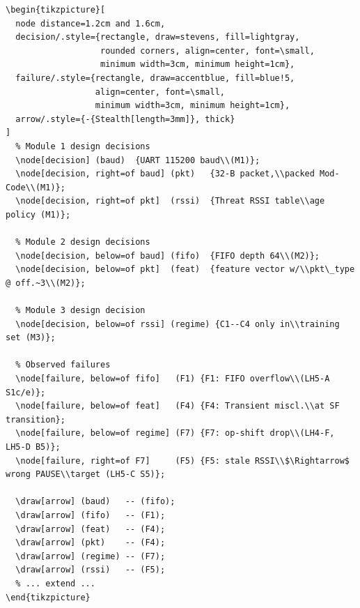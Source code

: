 \documentclass[11pt,letterpaper]{article}
\begin{document}
\begin{lstlisting}[language={[LaTeX]TeX}, caption={Starter TikZ skeleton for \texttt{cross\_domain\_map.tex} --- extend with your own nodes.}]
\begin{tikzpicture}[
  node distance=1.2cm and 1.6cm,
  decision/.style={rectangle, draw=stevens, fill=lightgray,
                   rounded corners, align=center, font=\small,
                   minimum width=3cm, minimum height=1cm},
  failure/.style={rectangle, draw=accentblue, fill=blue!5,
                  align=center, font=\small,
                  minimum width=3cm, minimum height=1cm},
  arrow/.style={-{Stealth[length=3mm]}, thick}
]
  % Module 1 design decisions
  \node[decision] (baud)  {UART 115200 baud\\(M1)};
  \node[decision, right=of baud] (pkt)   {32-B packet,\\packed Mod-Code\\(M1)};
  \node[decision, right=of pkt]  (rssi)  {Threat RSSI table\\age policy (M1)};

  % Module 2 design decisions
  \node[decision, below=of baud] (fifo)  {FIFO depth 64\\(M2)};
  \node[decision, below=of pkt]  (feat)  {feature vector w/\\pkt\_type @ off.~3\\(M2)};

  % Module 3 design decision
  \node[decision, below=of rssi] (regime) {C1--C4 only in\\training set (M3)};

  % Observed failures
  \node[failure, below=of fifo]   (F1) {F1: FIFO overflow\\(LH5-A S1c/e)};
  \node[failure, below=of feat]   (F4) {F4: Transient miscl.\\at SF transition};
  \node[failure, below=of regime] (F7) {F7: op-shift drop\\(LH4-F, LH5-D B5)};
  \node[failure, right=of F7]     (F5) {F5: stale RSSI\\$\Rightarrow$ wrong PAUSE\\target (LH5-C S5)};

  \draw[arrow] (baud)   -- (fifo);
  \draw[arrow] (fifo)   -- (F1);
  \draw[arrow] (feat)   -- (F4);
  \draw[arrow] (pkt)    -- (F4);
  \draw[arrow] (regime) -- (F7);
  \draw[arrow] (rssi)   -- (F5);
  % ... extend ...
\end{tikzpicture}
\end{lstlisting}
\end{document}
